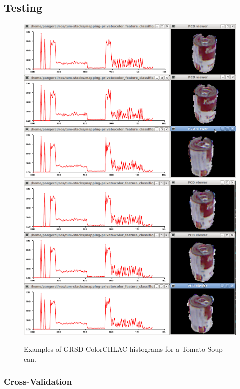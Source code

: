 \documentclass[conference]{sty/IEEEtran}
\begin{document}
\subsection{Testing}
\begin{figure}[htb!]
  \begin{center}
    \includegraphics[width=.9\columnwidth]{figures/colorCHLAC/real/tomato/tomato_hist_pcd.png}
    \includegraphics[width=.9\columnwidth]{figures/colorCHLAC/real/tomato/tomato_hist_pcd2.png}
    \caption{Examples of GRSD-ColorCHLAC histograms for a Tomato Soup can.}
    \label{fig:grsd_colorchlac_tomato}
  \end{center}
\end{figure}

\subsubsection{Cross-Validation}
\end{document}
